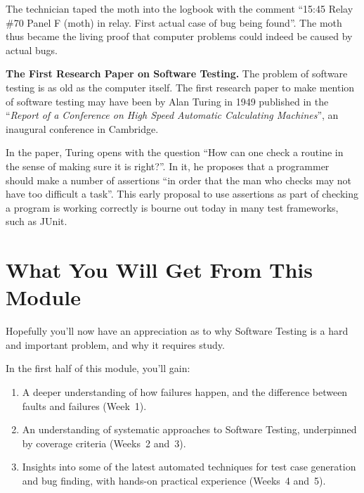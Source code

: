 The technician taped the moth into the logbook with the comment ``15:45 Relay
\#70 Panel F (moth) in relay. First actual case of bug being found''. The moth
thus became the living proof that computer problems could indeed be caused by
actual bugs.



{\bf The First Research Paper on Software Testing.}
%
The problem of software testing is as old as the computer itself. The first
research paper to make mention of software testing may have been by Alan Turing
in 1949 published in the ``{\it Report of a Conference on High Speed Automatic
Calculating Machines}'', an inaugural conference in Cambridge.

In the paper, Turing opens with the question ``How can one check a routine in
the sense of making sure it is right?''. In it, he proposes that a programmer
should make a number of assertions ``in order that the man who checks may not
have too difficult a task''. This early proposal to use assertions as part of
checking a program is working correctly is bourne out today in many test
frameworks, such as JUnit.




\section{What You Will Get From This Module}

Hopefully you'll now have an appreciation as to why Software Testing is a hard
and important problem, and why it requires study.


In the first half of this module, you'll gain:

\begin{enumerate}

    \item A deeper understanding of how failures happen, and the difference
    between faults and failures (Week~1).

    \item An understanding of systematic approaches to Software Testing,
    underpinned by coverage criteria (Weeks~2 and~3).

    \item Insights into some of the latest automated techniques for test case
    generation and bug finding, with hands-on practical experience (Weeks~4 and~5).

\end{enumerate}

